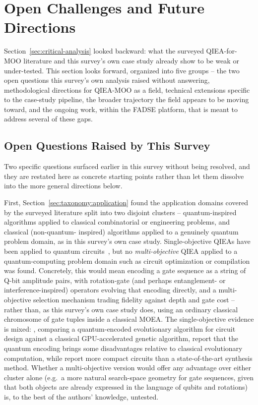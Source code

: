\section{Open Challenges and Future Directions}
\label{sec:open-challenges}

Section~\ref{sec:critical-analysis} looked backward: what the surveyed
QIEA-for-MOO literature and this survey's own case study already show
to be weak or under-tested. This section looks forward, organized into
five groups -- the two open questions this survey's own analysis raised
without answering, methodological directions for QIEA-MOO as a field,
technical extensions specific to the case-study pipeline, the
broader trajectory the field appears to be moving toward, and the
ongoing work, within the FADSE platform, that is meant to address
several of these gaps.

\subsection{Open Questions Raised by This Survey}
\label{sec:open-challenges:raised}

Two specific questions surfaced earlier in this survey without being
resolved, and they are restated here as concrete starting points rather
than let them dissolve into the more general directions below.

First, Section~\ref{sec:taxonomy:application} found the application
domains covered by the surveyed literature split into two disjoint
clusters -- quantum-inspired algorithms applied to classical
combinatorial or engineering problems, and classical (non-quantum-
inspired) algorithms applied to a genuinely quantum problem domain, as
in this survey's own case study. Single-objective QIEAs have been
applied to quantum circuits~\citep{ding2008qcircuits,krylov2019qeqea,chou2022qcsynthesis,li2025aqeaqas},
but no \emph{multi-objective} QIEA applied to a
quantum-computing problem domain such as circuit optimization or
compilation was found. Concretely, this would mean encoding a gate sequence as a
string of Q-bit amplitude pairs, with rotation-gate (and perhaps
entanglement- or interference-inspired) operators evolving that
encoding directly, and a multi-objective selection mechanism trading
fidelity against depth and gate cost -- rather than, as this survey's
own case study does, using an ordinary classical chromosome of gate
tuples inside a classical MOEA. The single-objective evidence is mixed:
\citet{krylov2019qeqea}, comparing a quantum-encoded evolutionary
algorithm for circuit design against a classical GPU-accelerated
genetic algorithm, report that the quantum encoding brings some
disadvantages relative to classical evolutionary computation, while
\citet{chou2022qcsynthesis} report more compact circuits than a
state-of-the-art synthesis method. Whether a multi-objective version
would offer any advantage over either cluster alone (e.g.\ a more
natural search-space geometry for gate sequences, given that both
objects are already expressed in the language of qubits and rotations)
is, to the best of the authors' knowledge, untested.


